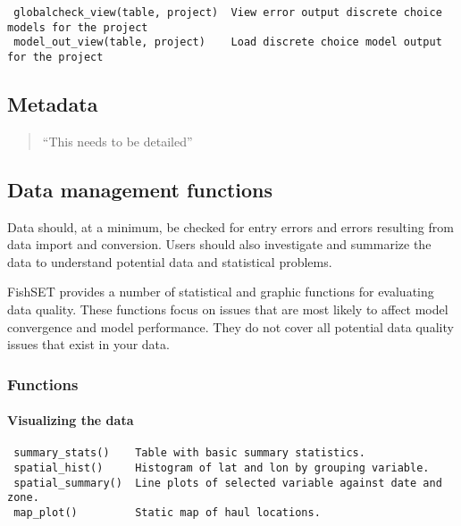 \documentclass[
]{article}
\begin{document}
\begin{verbatim}
 globalcheck_view(table, project)  View error output discrete choice models for the project
 model_out_view(table, project)    Load discrete choice model output for the project
\end{verbatim}

\hypertarget{metadata}{%
\subsection{Metadata}\label{metadata}}

\begin{quote}
``This needs to be detailed''
\end{quote}

\hypertarget{data-management-functions}{%
\subsection{Data management functions}\label{data-management-functions}}

Data should, at a minimum, be checked for entry errors and errors resulting from data import and conversion. Users should also investigate and summarize the data to understand potential data and statistical problems.

FishSET provides a number of statistical and graphic functions for evaluating data quality. These functions focus on issues that are most likely to affect model convergence and model performance. They do not cover all potential data quality issues that exist in your data.

\hypertarget{functions-2}{%
\subsubsection{Functions}\label{functions-2}}

\hypertarget{visualizing-the-data}{%
\paragraph{Visualizing the data}\label{visualizing-the-data}}

\begin{verbatim}
 summary_stats()    Table with basic summary statistics.
 spatial_hist()     Histogram of lat and lon by grouping variable.
 spatial_summary()  Line plots of selected variable against date and zone.
 map_plot()         Static map of haul locations.
\end{verbatim}
\end{document}
